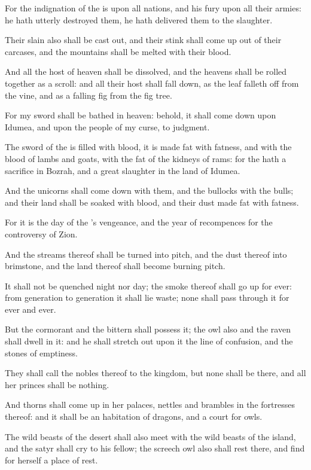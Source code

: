 \verse For the indignation of the \LORD is upon all nations, and his fury upon all their armies: he hath utterly destroyed them, he hath delivered them to the slaughter.

\verse Their slain also shall be cast out, and their stink shall come up out of their carcases, and the mountains shall be melted with their blood.

\verse And all the host of heaven shall be dissolved, and the heavens shall be rolled together as a scroll: and all their host shall fall down, as the leaf falleth off from the vine, and as a falling fig from the fig tree.

\verse For my sword shall be bathed in heaven: behold, it shall come down upon Idumea, and upon the people of my curse, to judgment.

\verse The sword of the \LORD is filled with blood, it is made fat with fatness, and with the blood of lambs and goats, with the fat of the kidneys of rams: for the \LORD hath a sacrifice in Bozrah, and a great slaughter in the land of Idumea.

\verse And the unicorns shall come down with them, and the bullocks with the bulls; and their land shall be soaked with blood, and their dust made fat with fatness.

\verse For it is the day of the \LORD's vengeance, and the year of recompences for the controversy of Zion.

\verse And the streams thereof shall be turned into pitch, and the dust thereof into brimstone, and the land thereof shall become burning pitch.

\verse It shall not be quenched night nor day; the smoke thereof shall go up for ever: from generation to generation it shall lie waste; none shall pass through it for ever and ever.

\verse But the cormorant and the bittern shall possess it; the owl also and the raven shall dwell in it: and he shall stretch out upon it the line of confusion, and the stones of emptiness.

\verse They shall call the nobles thereof to the kingdom, but none shall be there, and all her princes shall be nothing.

\verse And thorns shall come up in her palaces, nettles and brambles in the fortresses thereof: and it shall be an habitation of dragons, and a court for owls.

\verse The wild beasts of the desert shall also meet with the wild beasts of the island, and the satyr shall cry to his fellow; the screech owl also shall rest there, and find for herself a place of rest.

